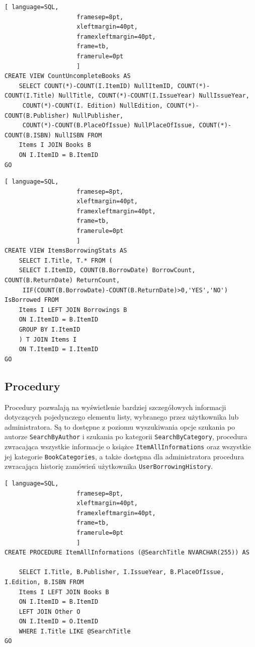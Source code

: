 \documentclass{article}
\renewcommand\t\texttt
\begin{document}
\begin{lstlisting}[ language=SQL,
                    framesep=8pt,
                    xleftmargin=40pt,
                    framexleftmargin=40pt,
                    frame=tb,
                    framerule=0pt
                    ]
CREATE VIEW CountUncompleteBooks AS
	SELECT COUNT(*)-COUNT(I.ItemID) NullItemID, COUNT(*)-COUNT(I.Title) NullTitle, COUNT(*)-COUNT(I.IssueYear) NullIssueYear,
	 COUNT(*)-COUNT(I. Edition) NullEdition, COUNT(*)-COUNT(B.Publisher) NullPublisher,
	 COUNT(*)-COUNT(B.PlaceOfIssue) NullPlaceOfIssue, COUNT(*)-COUNT(B.ISBN) NullISBN FROM
	Items I JOIN Books B
	ON I.ItemID = B.ItemID 
GO
\end{lstlisting}

\begin{lstlisting}[ language=SQL,
                    framesep=8pt,
                    xleftmargin=40pt,
                    framexleftmargin=40pt,
                    frame=tb,
                    framerule=0pt
                    ]
CREATE VIEW ItemsBorrowingStats AS
	SELECT I.Title, T.* FROM (
	SELECT I.ItemID, COUNT(B.BorrowDate) BorrowCount, COUNT(B.ReturnDate) ReturnCount,
	 IIF(COUNT(B.BorrowDate)-COUNT(B.ReturnDate)>0,'YES','NO') IsBorrowed FROM
	Items I LEFT JOIN Borrowings B
	ON I.ItemID = B.ItemID
	GROUP BY I.ItemID
	) T JOIN Items I
	ON T.ItemID = I.ItemID
GO

\end{lstlisting}


\subsection{Procedury}

Procedury pozwalają na wyświetlenie bardziej szczegółowych informacji dotyczących pojedynczego elementu listy, wybranego przez użytkownika lub administratora. Są to dostępne z poziomu wyszukiwania opcje szukania po autorze \t{SearchByAuthor} i szukania po kategorii \t{SearchByCategory},  procedura zwracająca wszystkie informacje o książce \t{ItemAllInformations} oraz wszystkie jej kategorie \t{BookCategories}, a także dostępna dla administratora procedura zwracająca historię zamówień użytkownika \t{UserBorrowingHistory}.


\begin{lstlisting}[ language=SQL,
                    framesep=8pt,
                    xleftmargin=40pt,
                    framexleftmargin=40pt,
                    frame=tb,
                    framerule=0pt
                    ]
CREATE PROCEDURE ItemAllInformations (@SearchTitle NVARCHAR(255)) AS 

	SELECT I.Title, B.Publisher, I.IssueYear, B.PlaceOfIssue, I.Edition, B.ISBN FROM
	Items I LEFT JOIN Books B
	ON I.ItemID = B.ItemID
	LEFT JOIN Other O
	ON I.ItemID = O.ItemID
	WHERE I.Title LIKE @SearchTitle
GO
\end{lstlisting}
\end{document}
